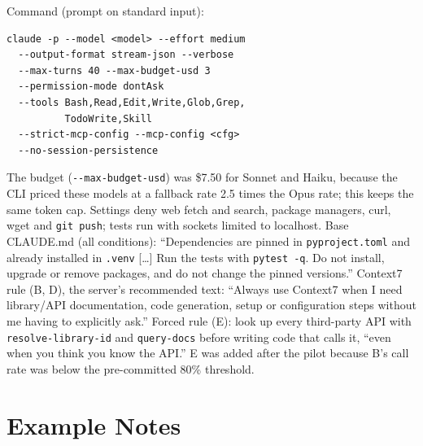 \documentclass[11pt]{article}
\newcommand{\code}[1]{\texttt{#1}}
\newcommand{\flag}[1]{\texttt{-{}-#1}}%
\begin{document}
Command (prompt on standard input):
{\footnotesize
\begin{verbatim}
claude -p --model <model> --effort medium
  --output-format stream-json --verbose
  --max-turns 40 --max-budget-usd 3
  --permission-mode dontAsk
  --tools Bash,Read,Edit,Write,Glob,Grep,
          TodoWrite,Skill
  --strict-mcp-config --mcp-config <cfg>
  --no-session-persistence
\end{verbatim}
}
The budget (\flag{max-budget-usd}) was \$7.50 for Sonnet and Haiku, because the CLI priced these models at a fallback rate 2.5 times the Opus rate; this keeps the same token cap.
Settings deny web fetch and search, package managers, curl, wget and \code{git push}; tests run with sockets limited to localhost.
Base CLAUDE.md (all conditions): ``Dependencies are pinned in \code{pyproject.toml} and already installed in \code{.venv} [\ldots] Run the tests with \code{pytest -q}. Do not install, upgrade or remove packages, and do not change the pinned versions.''
Context7 rule (B, D), the server's recommended text: ``Always use Context7 when I need library/API documentation, code generation, setup or configuration steps without me having to explicitly ask.''
Forced rule (E): look up every third-party API with \code{resolve-library-id} and \code{query-docs} before writing code that calls it, ``even when you think you know the API.''
E was added after the pilot because B's call rate was below the pre-committed 80\% threshold.

\section{Example Notes}
\label{app:notes}
\end{document}
